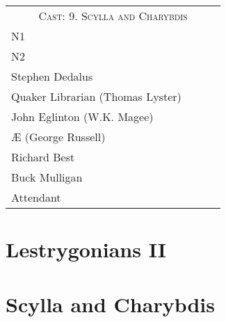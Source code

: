 \begin{tabular}{l p{5cm} l p{5cm}}
    \multicolumn{4}{c}{\Large \textsc{Cast: 9. Scylla and Charybdis}} \\
N1 \\  %
N2 \\  %
Stephen Dedalus \\
Quaker Librarian (Thomas Lyster) \\
John Eglinton (W.K. Magee) \\
Æ (George Russell) \\
Richard Best \\
Buck Mulligan \\
Attendant \\

\end{tabular}
\thispagestyle{empty}

\newpage


\setcounter{page}{1}
\setcounter{section}{7}  %

\section{Lestrygonians II}


\pagebreak

\section{Scylla and Charybdis}




